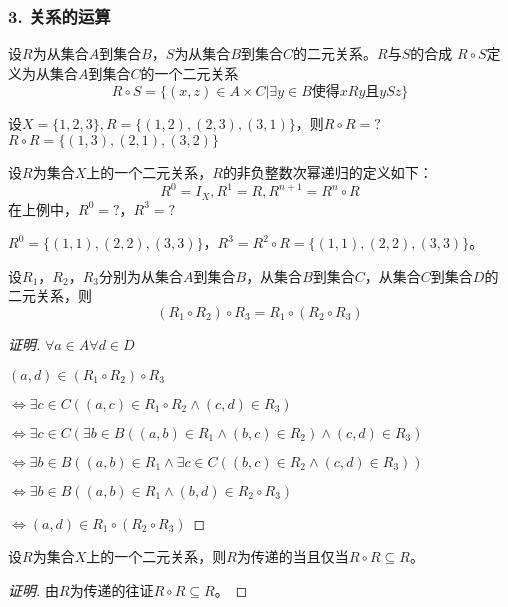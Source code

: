 \documentclass{beamer}
\begin{document}
\begin{CJK*}{UTF8}{gbsn}
\begin{frame}
  \frametitle{3. 关系的运算}
  \begin{Def}\justifying\let\raggedright\justifying
    设$R$为从集合$A$到集合$B$，$S$为从集合$B$到集合$C$的二元关系。$R$与$S$的合成
    $R\circ S$定义为从集合$A$到集合$C$的一个二元关系
    \[R\circ S = \{(x,z)\in A \times C |  \exists y \in B \text{使得} xRy \text{且} ySz\}\]
  \end{Def}\pause
\begin{Ex}
  设$X=\{1,2,3\}, R=\{(1,2),(2,3),(3,1)\}$，则$R\circ R=?$
\pause
  $R\circ R=\{(1,3),(2,1),(3,2)\}$
\end{Ex}
\pause
设$R$为集合$X$上的一个二元关系，$R$的非负整数次幂递归的定义如下：
\[R^0=I_X,R^1=R,R^{n+1}=R^{n}\circ R\]
\pause
在上例中，$R^0=?$，$R^3=?$
\pause

$R^0=\{(1,1),(2,2),(3,3)\}$，\pause$R^3=R^2\circ R=\{(1,1),(2,2),(3,3)\}$。
\end{frame}

\begin{frame}
  \begin{Thm}
    设$R_1$，$R_2$，$R_3$分别为从集合$A$到集合$B$，从集合$B$到集合$C$，从集合$C$到集合$D$的二元关系，则
    \[(R_1 \circ R_2)\circ R_3 = R_1 \circ (R_2 \circ R_3)\]
  \end{Thm}\pause
  \begin{proof}[证明]
    \pause
    \hspace{0.5cm}$\forall a\in A\forall d\in D$

    \pause
    \hspace{0.5cm}$(a,d)\in (R_1\circ R_2)\circ R_3$

    \pause
   $\Leftrightarrow \exists c\in C((a,c)\in R_1\circ R_2 \land (c,d)\in R_3)$

   \pause
   $\Leftrightarrow \exists c\in C(\exists b\in B ((a,b)\in R_1 \land (b,c)\in R_2) \land (c,d)\in R_3)$

   \pause
   $\Leftrightarrow \exists b\in B( (a,b)\in R_1 \land \exists c\in C ((b,c)\in R_2 \land (c,d)\in R_3))$

   \pause
   $\Leftrightarrow \exists b\in B( (a,b)\in R_1 \land (b,d)\in R_2\circ R_3)$

   \pause
   $\Leftrightarrow (a,d)\in R_1 \circ (R_2 \circ R_3)$
  \end{proof}
\end{frame}
\begin{frame} 
  \begin{Thm}
    设$R$为集合$X$上的一个二元关系，则$R$为传递的当且仅当$R\circ R \subseteq R$。
  \end{Thm}
  \pause
  \begin{proof}[证明]\justifying\let\raggedright\justifying
    \pause 由$R$为传递的往证$R\circ R\subseteq R$。


\end{proof}
\end{frame}
\end{CJK*}
\end{document}
